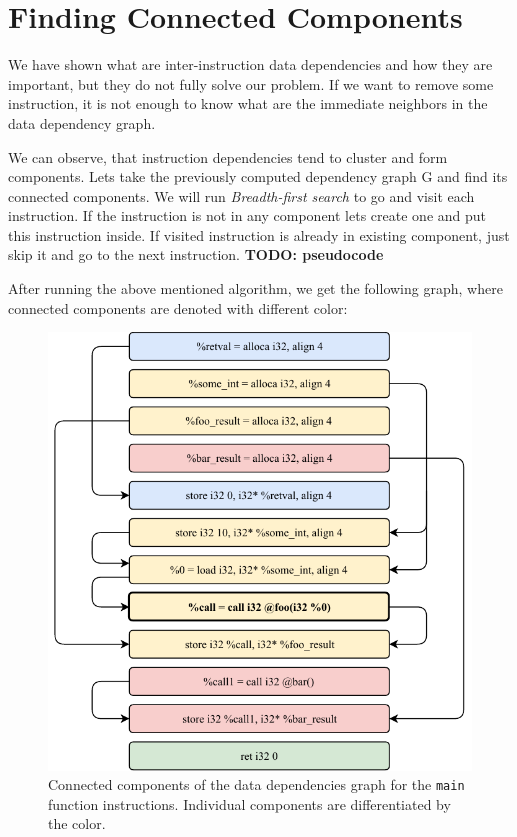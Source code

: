 \documentclass[12pt, twoside]{fithesis2}
\renewcommand{\_}{\leavevmode \kern0.07em\vbox{\hrule width0.4em}}
\begin{document}
\section{Finding Connected Components}
\label{sec:design-components}


We have shown what are inter-instruction data dependencies and how they are
important, but they do not fully solve our problem. If we want to remove
some instruction, it is not enough to know what are the immediate neighbors
in the data dependency graph.

We can observe, that instruction dependencies tend to cluster and form
components.
Lets take the previously computed dependency graph G and find its connected
components. We will run \emph{Breadth-first search} \cite{clrs} to go
and visit each instruction. If the instruction is not in any component lets
create one and put this instruction inside. If visited instruction is already
in existing component, just skip it and go to the next instruction.
\textbf{TODO: pseudocode}

After running the above mentioned algorithm, we get the following graph, where
connected components are denoted with different color:

\begin{figure}[ht]
    \centering
    \includegraphics[]{images/main_components.pdf}
    \caption{Connected components of the data dependencies graph
    for the \texttt{main} function instructions. Individual components
    are differentiated by the color.}
    \label{fig:connected_components_graph}
\end{figure}
\end{document}
